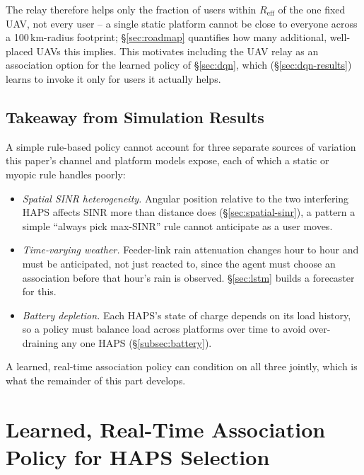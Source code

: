 \documentclass[]{ieeeaccess}
\begin{document}
\vspace{6pt}

The relay therefore helps only the fraction of users within $R_\mathrm{eff}$ of the one fixed UAV, not every user -- a single static platform cannot be close to everyone across a 100\,km-radius footprint; \S\ref{sec:roadmap} quantifies how many additional, well-placed UAVs this implies. This motivates including the UAV relay as an association option for the learned policy of \S\ref{sec:dqn}, which (\S\ref{sec:dqn-results}) learns to invoke it only for users it actually helps.


\subsection{Takeaway from Simulation Results}
\label{sec:motivation-learning}

A simple rule-based policy cannot account for three separate sources of variation this paper's channel and platform models expose, each of which a static or myopic rule handles poorly:
\begin{itemize}
  \item \emph{Spatial SINR heterogeneity.} Angular position relative to the two interfering HAPS affects SINR more than distance does (\S\ref{sec:spatial-sinr}), a pattern a simple ``always pick max-SINR'' rule cannot anticipate as a user moves.
  \item \emph{Time-varying weather.} Feeder-link rain attenuation changes hour to hour and must be anticipated, not just reacted to, since the agent must choose an association before that hour's rain is observed. \S\ref{sec:lstm} builds a forecaster for this.
  \item \emph{Battery depletion.} Each HAPS's state of charge depends on its load history, so a policy must balance load across platforms over time to avoid over-draining any one HAPS (\S\ref{subsec:battery}).
\end{itemize}
A learned, real-time association policy can condition on all three jointly, which is what the remainder of this part develops.

\section{Learned, Real-Time Association Policy for HAPS Selection}
\end{document}
